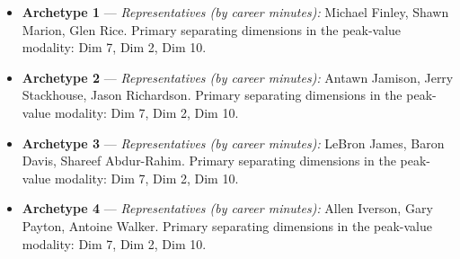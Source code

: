 \begin{itemize}
\item \textbf{Archetype 1} --- \emph{Representatives (by career minutes):} Michael Finley, Shawn Marion, Glen Rice. Primary separating dimensions in the peak-value modality: Dim 7, Dim 2, Dim 10.
\item \textbf{Archetype 2} --- \emph{Representatives (by career minutes):} Antawn Jamison, Jerry Stackhouse, Jason Richardson. Primary separating dimensions in the peak-value modality: Dim 7, Dim 2, Dim 10.
\item \textbf{Archetype 3} --- \emph{Representatives (by career minutes):} LeBron James, Baron Davis, Shareef Abdur-Rahim. Primary separating dimensions in the peak-value modality: Dim 7, Dim 2, Dim 10.
\item \textbf{Archetype 4} --- \emph{Representatives (by career minutes):} Allen Iverson, Gary Payton, Antoine Walker. Primary separating dimensions in the peak-value modality: Dim 7, Dim 2, Dim 10.
\end{itemize}

